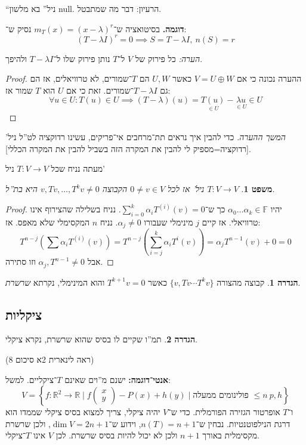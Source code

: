 \documentclass[]{article}
\newcommand\R     {\mathbb{R}}
\newcommand\F         {\mathbb{F}}
\newcommand\co        {\colon}
\newcommand\pms[1]    {\begin{pmatrix}
        #1
\end{pmatrix}}
\newcommand\ag        {\alpha}
\renewcommand\lg      {\lambda}
\newcommand\cl [1]    {\left ( #1 \right )}
\newcommand\ccb[1]    {\left \{ #1 \right \}}
\newtheorem{Theorem}{משפט}
\theoremstyle{definition}
\newtheorem{definition}{הגדרה}
\newcommand\theo  [1] {\begin{Theorem}#1\end{Theorem}}
\newcommand\defi  [1] {\begin{definition}#1\end{definition}}
\begin{document}
    ``ניל'' בא מלשון null. הרעיון: דבר מה שמתבטל. 
    
    \textbf{דוגמה. }בסיטואציה ש־$m_T(x) = (x - \lg)^{r}$ נסיק ש־: 
    \[ (T - \lg I)^{r} = 0\implies S = T - \lg I, \ n(S) = r \]
    
    \textit{הערה: }כל פירוק של $V$ ל־$T$ נותן פירוק שלו ל־$T - \lg I$ ולהיפך. 
    
    \begin{proof}
        ההערה נכונה כי אם $V = U \oplus W$ כאשר $U, W$ הם $T$־שמורים, לא טרוויאלים, אז הם גם $T - \lg I$־שמורים. זאת כי אם $U$ הוא $T$ שמור אז: 
        \[ \forall u \in U \co T(u) \in U \implies (T - \lg)(u) = \underset{\in U}{T(u)} - \underset{\in U}{\lg u} \in U \]
        
    \end{proof}
    \textit{המשך ההערה. }כדי להבין איך נראים תת־מרחבים אי־פריקים, עשינו רדוקציה לט''ל ניל' [רדוקציה=מספיק לי להבין את המקרה הזה בשביל להבין את המקרה הכללי]. 
    
    מעתה נניח שכל $T \co V \to V$ ניל'
    
    \theo{$T \co V \to V$ ניל' אז לכל $0 \neq v \in V$ הקבוצה $v, Tv, \dots, T^{k}v \neq 0$ היא בת''ל. }
    \begin{proof}
        יהיו $\ag_0 \dots \ag_k \in \F$ כך ש־$\sum_{i = 0}^{k}\ag_i T^{(i)}(v) = 0$. נניח בשלילה שהצירוף אינו טרוויאלי. אז קיים $j$ מינימלי שעבורו $\ag_j \neq 0$. נניח $n$ המקסימלי שלא מאפס. אז: 
        \[ T^{n - j}\cl{\sum \ag_i T^{(i)}(v)} = T^{n - j}\cl{\sum_{i = j}^{k}\ag_iT^{i}(v)} = \ag_jT^{n - 1}(v) + 0 = 0 \]
        אבל $\ag_j, T^{n - 1} \neq 0$ וזו סתירה. 
    \end{proof}
    
    \defi{קבוצה מהצורה $\{v, Tv \cdots T^kv\}$ כאשר $T^{k + 1}v = 0$ והוא המינימלי, נקרתא \textit{שרשרת}. }
    
    \subsection{ציקליות}
    \defi{תמ''ו שקיים לו בסיס שהוא שרשרת, נקרא ציקלי. }(ראה לינארית 2א סיכום 8)
    
    \textbf{אנטי־דוגמה: }ישנם מ''וים שאינם $T$־ציקליים. למשל: 
    \[ V = \ccb{f \co \R^2 \to \R \mid f\pms{x \\ y} - P(x) + h(y) \mid \text{פולינומים ממעלה $\le n$} \ p, h} \]
    ו־$T$ אופרטור הגזירה הפורמלית. 
    כדי ש־$V$ יהיה ציקלי, צריך למצוא בסיס ציקלי שממדו הוא דרגת הנילפוטנטיות. נבחין ש־$n(T) = n  + 1$, וידוע ש־$\dim V = 2n + 1$, ולכן שרשרת מקסימלית באורך $n + 1$ ולכן לא יכול להיות בסיס שרשרת. לכן $V$ אינו $T$־ציקלי. 
    
\end{document}
